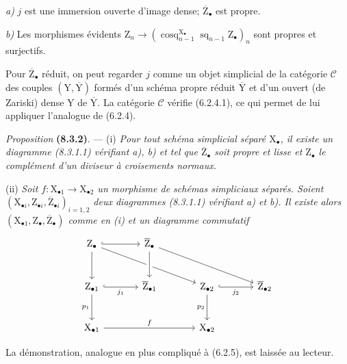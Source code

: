 \documentclass[11pt,leqno]{article}
\begin{document}
\textit{a)} \(j\) est une immersion ouverte d’image dense; \(\overline{\mathrm{Z}}_\bullet\) est propre.

\textit{b)} Les morphismes évidents \(\mathrm{Z}_n\to(\operatorname{cosq}_{n-1}^{\mathrm{X}_\bullet}\operatorname{sq}_{n-1}\mathrm{Z}_\bullet)_n\) sont propres et surjectifs.

Pour \(\overline{\mathrm{Z}}_\bullet\) réduit, on peut regarder \(j\) comme un objet simplicial de la catégorie \(\mathcal{C}\) des couples \((\mathrm{Y},\overline{\mathrm{Y}})\) formés d’un schéma propre réduit \(\overline{\mathrm{Y}}\) et d’un ouvert (de Zariski) dense \(\mathrm{Y}\) de \(\overline{\mathrm{Y}}\). La catégorie \(\mathcal{C}\) vérifie (6.2.4.1), ce qui permet de lui appliquer l’analogue de (6.2.4).

\textit{Proposition} \textbf{(8.3.2)}. — (i) \textit{Pour tout schéma simplicial séparé \(\mathrm{X}_\bullet\), il existe un diagramme \textup{(8.3.1.1)} vérifiant a), b) et tel que \(\overline{\mathrm{Z}}_\bullet\) soit propre et lisse et \(\mathrm{Z}_\bullet\) le complément d’un diviseur à croisements normaux.}

(ii) \textit{Soit \(f:\mathrm{X}_{\bullet1}\to\mathrm{X}_{\bullet2}\) un morphisme de schémas simpliciaux séparés. Soient \((\mathrm{X}_{\bullet i},\mathrm{Z}_{\bullet i},\overline{\mathrm{Z}}_{\bullet i})_{i=1,2}\) deux diagrammes \textup{(8.3.1.1)} vérifiant a) et b). Il existe alors \((\mathrm{X}_{\bullet1},\mathrm{Z}_\bullet,\overline{\mathrm{Z}}_\bullet)\) comme en \textup{(i)} et un diagramme commutatif}
\[
\begin{tikzcd}[column sep=large,row sep=large]
\mathrm{Z}_\bullet
  \arrow[r,hook] \arrow[d] \arrow[drr]
 & \overline{\mathrm{Z}}_\bullet
   \arrow[d,crossing over] \arrow[drr]
 & &\\
\mathrm{Z}_{\bullet1}
  \arrow[r,hook,"j_1"'] \arrow[d,"p_1"']
 & \overline{\mathrm{Z}}_{\bullet1}
 & \mathrm{Z}_{\bullet2}
   \arrow[r,hook,"j_2"'] \arrow[d,"p_2"']
 & \overline{\mathrm{Z}}_{\bullet2}\\
\mathrm{X}_{\bullet1} \arrow[rr,"f"]
 & & \mathrm{X}_{\bullet2} &
\end{tikzcd}
\]

La démonstration, analogue en plus compliqué à (6.2.5), est laissée au lecteur.
\end{document}

